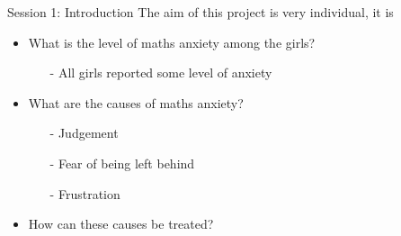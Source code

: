 \documentclass{beamer}  %
\begin{document}


\begin{frame}{Session 1: Introduction}
    The aim of this project is very individual, it is 
    \begin{itemize}
        \item What is the level of maths anxiety among the girls?
        \begin{itemize}
            \item[-]All girls reported some level of anxiety
        \end{itemize}
        \item What are the causes  of maths anxiety?
        \begin{itemize}
            \item[-] Judgement
            \item[-] Fear of being left behind
            \item[-] Frustration
        \end{itemize}
        \item How can these causes be treated?
    \end{itemize}
\end{frame}
\end{document}
